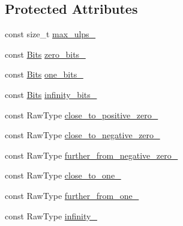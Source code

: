 \subsection*{Protected Attributes}
\begin{DoxyCompactItemize}
\item 
const size\+\_\+t \hyperlink{classtesting_1_1gmock__matchers__test_1_1FloatingPointTest_a253abb77b6555a98a100c253224bb860}{max\+\_\+ulps\+\_\+}
\item 
const \hyperlink{classtesting_1_1gmock__matchers__test_1_1FloatingPointTest_addf899bd832ae51103198d201d2f2ea2}{Bits} \hyperlink{classtesting_1_1gmock__matchers__test_1_1FloatingPointTest_afb9b6beb1f152693155cf7db4e1fc4d2}{zero\+\_\+bits\+\_\+}
\item 
const \hyperlink{classtesting_1_1gmock__matchers__test_1_1FloatingPointTest_addf899bd832ae51103198d201d2f2ea2}{Bits} \hyperlink{classtesting_1_1gmock__matchers__test_1_1FloatingPointTest_ae26de8492d307d2b4c30f6b952d9a412}{one\+\_\+bits\+\_\+}
\item 
const \hyperlink{classtesting_1_1gmock__matchers__test_1_1FloatingPointTest_addf899bd832ae51103198d201d2f2ea2}{Bits} \hyperlink{classtesting_1_1gmock__matchers__test_1_1FloatingPointTest_a3c25f403d51e6c8ed3fe7856cab1330b}{infinity\+\_\+bits\+\_\+}
\item 
const Raw\+Type \hyperlink{classtesting_1_1gmock__matchers__test_1_1FloatingPointTest_a750555206ab9d5959d6dc84f8a760c57}{close\+\_\+to\+\_\+positive\+\_\+zero\+\_\+}
\item 
const Raw\+Type \hyperlink{classtesting_1_1gmock__matchers__test_1_1FloatingPointTest_a641f5e223c25b6d6fb108b322acaa39d}{close\+\_\+to\+\_\+negative\+\_\+zero\+\_\+}
\item 
const Raw\+Type \hyperlink{classtesting_1_1gmock__matchers__test_1_1FloatingPointTest_acc020c4d830d9e9d910b92bb466d540f}{further\+\_\+from\+\_\+negative\+\_\+zero\+\_\+}
\item 
const Raw\+Type \hyperlink{classtesting_1_1gmock__matchers__test_1_1FloatingPointTest_a34c97dc5dc07ea62764de87fdd8b7764}{close\+\_\+to\+\_\+one\+\_\+}
\item 
const Raw\+Type \hyperlink{classtesting_1_1gmock__matchers__test_1_1FloatingPointTest_a049ba2d5d371e8aea6ada1ab5312b1bb}{further\+\_\+from\+\_\+one\+\_\+}
\item 
const Raw\+Type \hyperlink{classtesting_1_1gmock__matchers__test_1_1FloatingPointTest_a21d8a019a6365ddff80e301a6163f43f}{infinity\+\_\+}
\item 

\end{DoxyCompactItemize}
